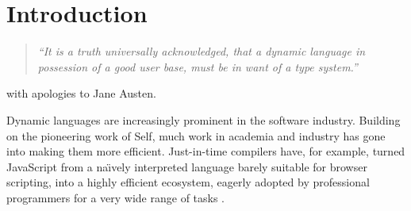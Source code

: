 
\section{Introduction}
\label{sec:introduction}

\begin{verse}
  \textit{``It is a truth universally acknowledged, that a dynamic language
    in possession of a good user base, must be in want of a type system.''}
\end{verse}
\vspace*{-6ex}
\begin{flushright}
with apologies to Jane Austen.
\end{flushright}
  


%
%

Dynamic languages are increasingly prominent in the software industry.
Building on the pioneering work of Self\citep{Self}, 
much work in academia and industry
has gone into making them more efficient\citep{Bolz2013,Bolz:2013:IMT,Wurthinger:2017:PPE,Daloze2016,Clifford:2015:MM,Degenbaev:2016:ITG}.
Just-in-time compilers have, for example, turned JavaScript from a
na{\"\i}vely interpreted language barely suitable for browser scripting, 
into a highly efficient ecosystem, eagerly adopted
by professional programmers for a very wide range of tasks \cite{Pang2018}.

